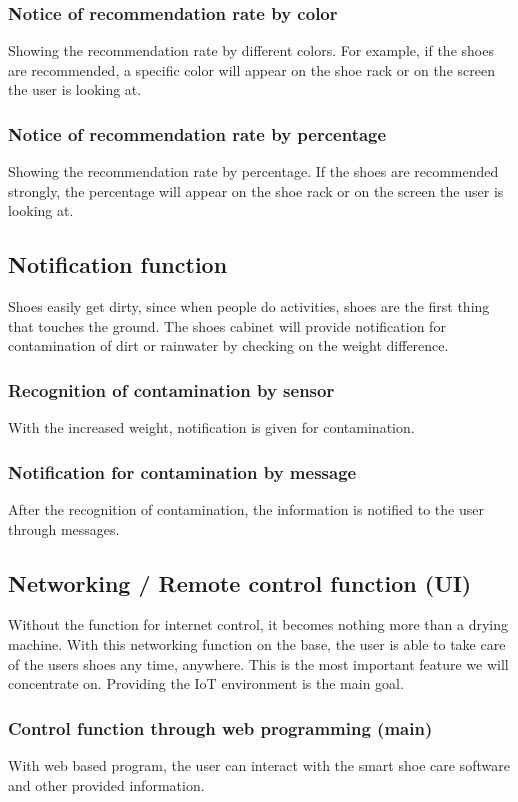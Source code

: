 \documentclass[conference]{IEEEtran}
\begin{document}
\subsubsection{ Notice of recommendation rate by color}
Showing the recommendation rate by different colors. For example, if the shoes are recommended, a specific color will appear on the shoe rack or on the screen the user is looking at. 
\subsubsection{Notice of recommendation rate by percentage}
Showing the recommendation rate by percentage. If the shoes are recommended strongly, the percentage will appear on the shoe rack or on the screen the user is looking at. 


\subsection{Notification function}
Shoes easily get dirty, since when people do activities, shoes are the first thing that touches the ground. The shoes cabinet will provide notification for contamination of dirt or rainwater by checking on the weight difference.
\subsubsection{Recognition of contamination by sensor}
With the increased weight, notification is given for contamination.
\subsubsection{Notification for contamination by message}
After the recognition of contamination, the information is notified to the user through messages.


\subsection{Networking / Remote control function (UI)}
Without the function for internet control, it becomes nothing more than a drying machine. With this networking function on the base, the user is able to take care of the users shoes any time, anywhere. This is the most important feature we will concentrate on. Providing the IoT environment is the main goal. 
\subsubsection{Control function through web programming (main)}
With web based program, the user can interact with the smart shoe care software and other provided information.
\end{document}
